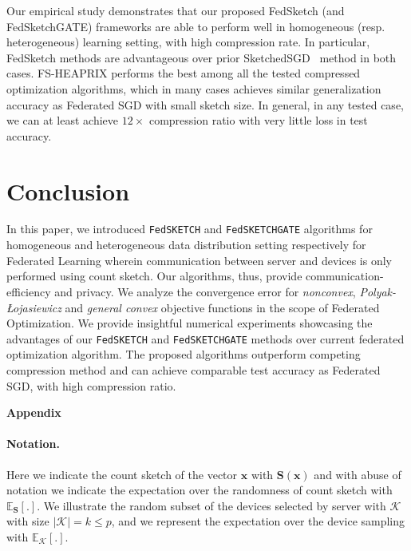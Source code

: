 \documentclass[twoside]{article}
\newcommand{\pl}{Polyak-\L{}ojasiewicz}
\begin{document}
Our empirical study demonstrates that our proposed FedSketch (and FedSketchGATE) frameworks are able to perform well in homogeneous (resp. heterogeneous) learning setting, with high compression rate. In particular, FedSketch methods are advantageous over prior SketchedSGD~\cite{ivkin2019communication} method in both cases. FS-HEAPRIX performs the best among all the tested compressed optimization algorithms, which in many cases achieves similar generalization accuracy as Federated SGD with small sketch size. In general, in any tested case, we can at least achieve $12\times$ compression ratio with very little loss in test accuracy.



\section{Conclusion}

In this paper, we introduced \texttt{FedSKETCH} and \texttt{FedSKETCHGATE} algorithms for homogeneous and heterogeneous data distribution setting respectively for Federated Learning wherein communication between server and devices is only performed using count sketch. 
Our algorithms, thus, provide communication-efficiency and privacy. 
We analyze the convergence error for \emph{nonconvex}, \emph{\pl} and \emph{general convex} objective functions in the scope of Federated Optimization.  
We provide insightful numerical experiments showcasing the advantages of our \texttt{FedSKETCH} and \texttt{FedSKETCHGATE} methods over current federated optimization algorithm. The proposed algorithms outperform competing compression method and can achieve comparable test accuracy as Federated SGD, with high compression ratio.




\newpage
\appendix
%


\noindent\textbf{\LARGE Appendix}\\

\paragraph{Notation.} Here we indicate the count sketch of the vector $\boldsymbol{x}$ with $\mathbf{S}(\boldsymbol{x})$ and with abuse of notation we indicate the expectation over the randomness of count sketch with $\mathbb{E}_{\mathbf{S}}[.]$. We illustrate the random subset of the devices selected by server with $\mathcal{K}$ with size $|\mathcal{K}|=k\leq p$, and we represent the expectation over the device sampling with $\mathbb{E}_{\mathcal{K}}[.]$. 
\end{document}
